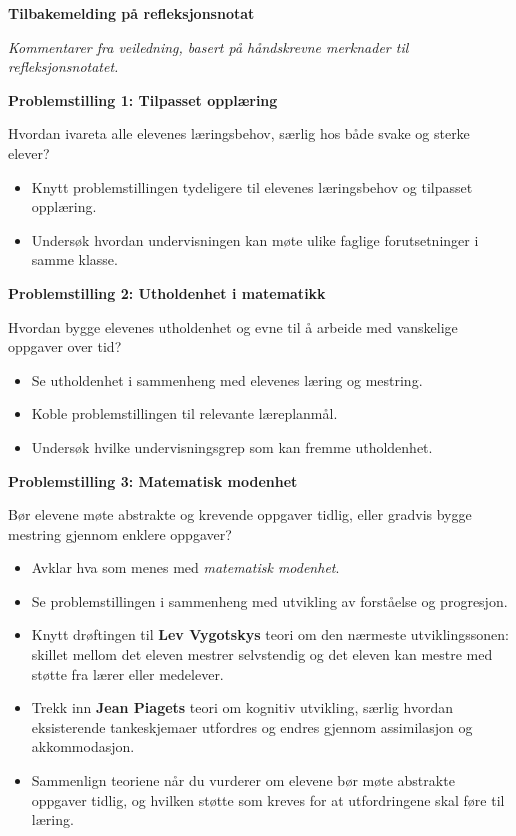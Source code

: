 \documentclass[10pt,a4paper,landscape]{article}
\begin{document}
\clearpage


\clearpage
\vspace*{4mm}
{\centering\fontsize{16}{19}\selectfont\bfseries Tilbakemelding på refleksjonsnotat\par}
\vspace{7mm}

\textit{Kommentarer fra veiledning, basert på håndskrevne merknader til refleksjonsnotatet.}

\par\vspace{7mm}
\textbf{Problemstilling 1: Tilpasset opplæring}
\par\smallskip
Hvordan ivareta alle elevenes læringsbehov, særlig hos både svake og sterke elever?
\begin{itemize}
  \item Knytt problemstillingen tydeligere til elevenes læringsbehov og tilpasset opplæring.
  \item Undersøk hvordan undervisningen kan møte ulike faglige forutsetninger i samme klasse.
\end{itemize}

\par\vspace{5mm}
\textbf{Problemstilling 2: Utholdenhet i matematikk}
\par\smallskip
Hvordan bygge elevenes utholdenhet og evne til å arbeide med vanskelige oppgaver over tid?
\begin{itemize}
  \item Se utholdenhet i sammenheng med elevenes læring og mestring.
  \item Koble problemstillingen til relevante læreplanmål.
  \item Undersøk hvilke undervisningsgrep som kan fremme utholdenhet.
\end{itemize}

\par\vspace{5mm}
\textbf{Problemstilling 3: Matematisk modenhet}
\par\smallskip
Bør elevene møte abstrakte og krevende oppgaver tidlig, eller gradvis bygge mestring gjennom enklere oppgaver?
\begin{itemize}
  \item Avklar hva som menes med \emph{matematisk modenhet}.
  \item Se problemstillingen i sammenheng med utvikling av forståelse og progresjon.
  \item Knytt drøftingen til \textbf{Lev Vygotskys} teori om den nærmeste utviklingssonen: skillet mellom det eleven mestrer selvstendig og det eleven kan mestre med støtte fra lærer eller medelever.
  \item Trekk inn \textbf{Jean Piagets} teori om kognitiv utvikling, særlig hvordan eksisterende tankeskjemaer utfordres og endres gjennom assimilasjon og akkommodasjon.
  \item Sammenlign teoriene når du vurderer om elevene bør møte abstrakte oppgaver tidlig, og hvilken støtte som kreves for at utfordringene skal føre til læring.
\end{itemize}
\end{document}
